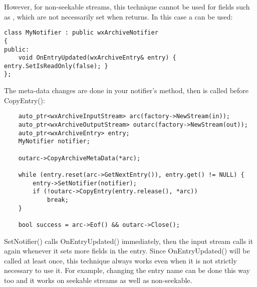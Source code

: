 However, for non-seekable streams, this technique cannot be used for
fields such as ,
which are not necessarily set when
  returns. In
this case a  can be used:

\begin{verbatim}
class MyNotifier : public wxArchiveNotifier
{
public:
    void OnEntryUpdated(wxArchiveEntry& entry) { entry.SetIsReadOnly(false); }
};

\end{verbatim}

The meta-data changes are done in your notifier's
  method,
then  is called before
CopyEntry():

\begin{verbatim}
    auto_ptr<wxArchiveInputStream> arc(factory->NewStream(in));
    auto_ptr<wxArchiveOutputStream> outarc(factory->NewStream(out));
    auto_ptr<wxArchiveEntry> entry;
    MyNotifier notifier;

    outarc->CopyArchiveMetaData(*arc);

    while (entry.reset(arc->GetNextEntry()), entry.get() != NULL) {
        entry->SetNotifier(notifier);
        if (!outarc->CopyEntry(entry.release(), *arc))
            break;
    }

    bool success = arc->Eof() && outarc->Close();

\end{verbatim}

SetNotifier() calls OnEntryUpdated() immediately, then the input
stream calls it again whenever it sets more fields in the entry. Since
OnEntryUpdated() will be called at least once, this technique always
works even when it is not strictly necessary to use it. For example,
changing the entry name can be done this way too and it works on seekable
streams as well as non-seekable.


